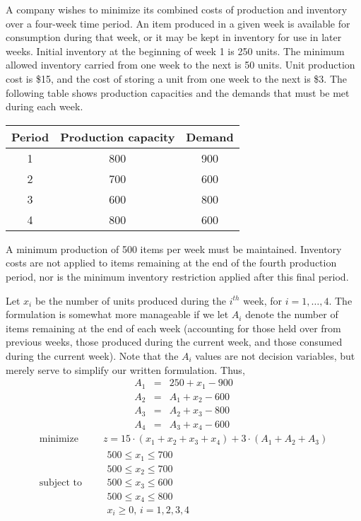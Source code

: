   \begin{Exercise}
  A company wishes to minimize its combined costs of production and inventory over a four-week time period. An item produced in a given week is available for consumption during that week, or it may be kept in inventory for use in later weeks. Initial inventory at the beginning of week 1 is 250 units. The minimum allowed inventory carried from one week to the next is 50 units. Unit production cost is \$15, and the cost of storing a unit from one week to the next is \$3. The following table shows production capacities and the demands that must be met during each week.\cite{carter_operations_2019}
    \begin{center}
    \begin{tabular}{ccc}
      Period  & Production capacity & Demand  \\\hline
      1 &  800 &  900 \\
      2 & 700 & 600\\
      3 & 600 & 800\\
      4 & 800 & 600
    \end{tabular}
  \end{center}
  A minimum production of 500 items per week must be maintained. Inventory costs are not applied to items remaining at the end of the fourth production period, nor is the minimum inventory restriction applied after this final period.
  \end{Exercise}
  Let $x_i$ be the number of units produced during the $i^{th}$ week, for $i = 1, …, 4$. The formulation is somewhat more manageable if we let $A_i$ denote the number of items remaining at the end of each week (accounting for those held over from previous weeks, those produced during the current week, and those consumed during the current week). Note that the $A_i$ values are not decision variables, but merely serve to simplify our written formulation. Thus,
  \begin{eqnarray*}
    A_1&=&250+x_1-900\\
    A_2&=&A_1+x_2-600\\
    A_3&=&A_2+x_3-800\\
    A_4&=&A_3+x_4-600
  \end{eqnarray*}
  \begin{equation*}
    \begin{aligned}
      \text{minimize } \quad & z = 15\cdot(x_1+x_2+x_3+x_4)+3\cdot (A_1+A_2+A_3) \\
      \text{subject to }\quad &
      \begin{array}{c}
        500 \leq x_1 \leq 700\\
        500 \leq x_2 \leq 700\\
        500 \leq x_3 \leq 600\\
        500 \leq x_4 \leq 800\\
        x_i \geq 0, \, i=1,2,3,4
      \end{array}
    \end{aligned}
  \end{equation*}


